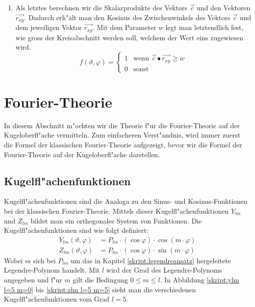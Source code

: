 \begin{refsection}
\begin{enumerate}
\item Als letztes berechnen wir die Skalarprodukte des Vektors $\vec{c}$
und den Vektoren $\overrightarrow{r_{xy}}$.
Dadurch erh"alt man den Kosinus des Zwischenwinkels des Vektors $\vec{c}$
und dem jeweiligen Vektor $\overrightarrow{r_{xy}}$.
Mit dem Parameter $w$ legt man letztendlich fest, wie gross der 
Kreisabschnitt werden soll, welchem der Wert eins zugewiesen wird.
\begin{equation}
f(\vartheta, \varphi) =\begin{cases}
1 & \text{wenn } \vec{c} \bullet \overrightarrow{r_{xy}} \geq w\\
0 & \text{sonst}
\end{cases}
\label{skript:Kugelfunktion Formel}
\end{equation}
\end{enumerate}
\section{Fourier-Theorie}
In diesem Abschnitt m"ochten wir die Theorie f"ur die Fourier-Theorie
auf der Kugeloberfl"ache vermitteln. 
Zum einfacheren Verst"andnis, wird immer zuerst die Formel der 
klassischen Fourier-Theorie aufgezeigt, bevor wir die Formel der 
Fourier-Theorie auf der Kugeloberfl"ache darstellen.

\subsection{Kugelfl"achenfunktionen}
Kugelfl"achenfunktionen sind die Analoga zu den Sinus- und 
Kosinus-Funktionen bei der klassischen Fourier-Theorie. 
Mittels dieser Kugelfl"achenfunktionen $Y_{lm}$ und $Z_{lm}$ 
bildet man ein orthogonales System von Funktionen. 
Die Kugelfl"achenfunktionen sind wie folgt definiert:
\begin{align*}
Y_{lm}(\vartheta, \varphi)& = P_{lm} \cdot (\cos \varphi) \cdot \cos(m \cdot \varphi)
\\
Z_{lm}(\vartheta, \varphi)& = P_{lm} \cdot (\cos \varphi) \cdot \sin(m \cdot \varphi)
\end{align*}
Wobei es sich bei $P_{lm}$ um das in Kapitel \ref{skript:legendreansatz} 
hergeleitete Legendre-Polynom handelt. 
Mit $l$ wird der Grad des Legendre-Polynoms angegeben und f"ur $m$
gilt die Bedingung $0 \leq m \leq l$.  
In Abbildung \ref{skript:ylm l=5 m=0} bis \ref{skript:zlm l=5 m=5} sieht man die verschiedenen 
Kugelfl"achenfunktionen vom Grad $l = 5$.


\end{refsection}
